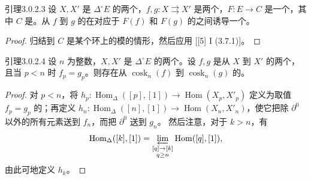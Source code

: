 \begin{SGAresult}{引理}{3.0.2.3}
设 $X,X'$ 是 $\Delta^\circ E$ 的两个，$f,g:X\rightrightarrows X'$ 是两个，$F:E\to C$ 是一个，其中 $C$ 是。从 $f$ 到 $g$ 的在对应于 $F(f)$ 和 $F(g)$ 的之间诱导一个。
\end{SGAresult}
\begin{proof}
归结到 $C$ 是某个环上的模的情形，然后应用 [[5] I (3.7.1)]。
\end{proof}
\begin{SGAresult}{引理}{3.0.2.4}
设 $n$ 为整数，$X,X'$ 是 $\Delta^\circ E$ 的两个。设 $f,g$ 是从 $X$ 到 $X'$ 的两个，且当 $p<n$ 时 $f_p=g_p$。则存在从 $\operatorname{cosk}_n(f)$ 到 $\operatorname{cosk}_n(g)$ 的。
\end{SGAresult}
\begin{proof}
对 $p<n$，将 $h_p:\operatorname{Hom}_\Delta([p],[1])\to\operatorname{Hom}(X_p,X'_p)$ 定义为取值 $f_p=g_p$ 的；再定义 $h_n:\operatorname{Hom}_\Delta([n],[1])\to\operatorname{Hom}(X_n,X'_n)$，使它把除 $\partial^0$ 以外的所有元素送到 $f_n$，而把 $\partial^0$ 送到 $g_n$。
然后注意，对于 $k>n$，有
\[
\operatorname{Hom}_\Delta([k],[1])=
\varprojlim_{\substack{[q]\to[k]\\q\geq n}}\operatorname{Hom}([q],[1]),
\]
由此可地定义 $h_k$。
\end{proof}

